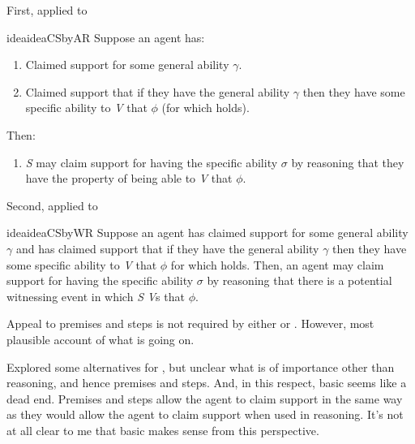 \begin{note}[\gsi{}++]
  First, \gsi{} applied to \AR{}
  \begin{restatable}{idea}{ideaCSbyAR}\label{idea:CS-by-AR}
    Suppose an agent has:
    \begin{enumerate}
    \item Claimed support for some general ability \(\gamma\).
    \item Claimed support that if they have the general ability \(\gamma\) then they have some specific ability to \emph{V} that \(\phi\) (for which  holds).
    \end{enumerate}
    Then:
    \begin{enumerate}[resume]
    \item \emph{S} may claim support for having the specific ability \(\sigma\) by reasoning that they have the property of being able to \emph{V} that \(\phi\).
    \end{enumerate}
    \vspace{-\baselineskip}
  \end{restatable}

  Second, \gsi{} applied to \WR{}

  \begin{restatable}{idea}{ideaCSbyWR}\label{idea:CS-by-WR}\label{W:s}
    Suppose an agent has claimed support for some general ability \(\gamma\) and has claimed support that if they have the general ability \(\gamma\) then they have some specific ability to \emph{V} that \(\phi\) for which  holds.
    Then, an agent may claim support for having the specific ability \(\sigma\) by reasoning that there is a potential witnessing event in which \emph{S} \emph{V}s that \(\phi\).
  \end{restatable}
\end{note}

\begin{note}[Alternatives]
  Appeal to premises and steps is not required by either \AR{} or \WR{}.
  However, most plausible account of what is going on.

  Explored some alternatives for \AR{}, but unclear what is of importance other than reasoning, and hence premises and steps.
  And, in this respect, basic \AR{} seems like a dead end.
  Premises and steps allow the agent to claim support in the same way as they would allow the agent to claim support when used in reasoning.
  It's not at all clear to me that basic \AR{} makes sense from this perspective.
\end{note}


